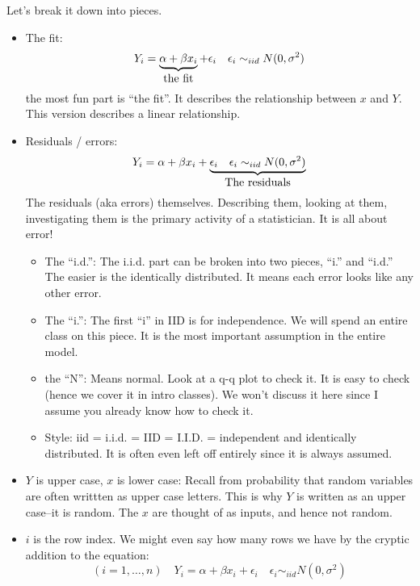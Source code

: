 \documentclass{article}
\begin{document}
Let's break it down into pieces.
\begin{itemize}
\item The fit:
\begin{displaymath}
Y_i = \underbrace{\alpha + \beta x_i}_{\hbox{the fit}} + \epsilon_i \quad \epsilon_i \sim_{iid}
N(0,\sigma^2)
\end{displaymath}
the most fun part is ``the fit''.  It describes the relationship
between $x$ and $Y$.  This version describes a linear relationship. 

\item Residuals / errors:
\begin{displaymath}
Y_i = \alpha + \beta x_i + \underbrace{\epsilon_i \quad \epsilon_i
\sim_{iid} N(0,\sigma^2)}_{\hbox{The residuals}}
\end{displaymath}
The residuals (aka errors) themselves.  Describing them,
looking at them, investigating them is the primary activity of a
statistician.  It is all about error!
\begin{itemize}
\item The ``i.d.'':  The i.i.d. part can be broken into two pieces, ``i.''
and ``i.d.''  The easier is the identically distributed.  It means
each error looks like any other error.

\item The ``i.'': The first ``i'' in IID is for independence.  We will
spend an entire class on this piece.  It is the most important
assumption in the entire model.

\item the ``N'': Means normal.  Look at a q-q plot to check it.  It is
easy to check (hence we cover it in intro classes).  We won't discuss
it here since I assume you already know how to check it.

\item Style: iid = i.i.d. = IID = I.I.D. = independent and identically
distributed.  It is often even left off entirely since it is always
assumed. 
\end{itemize}

\item $Y$ is upper case, $x$ is lower case: Recall from probability that
random variables are often writtten as upper case letters.  This is
why $Y$ is written as an upper case--it is random.  The $x$ are
thought of as inputs, and hence not random.

\item $i$ is the row index.  We might even say how many rows we have
by the cryptic addition to the equation:
\begin{displaymath}
(i = 1,\ldots,n) \quad
Y_i = \alpha + \beta x_i + \epsilon_i \quad \epsilon_i \sim_{iid}
N(0,\sigma^2)
\end{displaymath}
\end{itemize}
\end{document}
